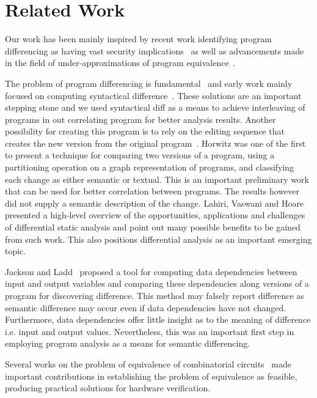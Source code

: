 \section{Related Work}

Our work has been mainly inspired by recent work identifying program differencing as having vast security implications~\cite{BrumleyPoosankamSongZheng08,SongSunZhang09} as well as advancements made in the field of under-approximations of program equivalence~\cite{GodlinStrichman09, KawaguchiLahiriRebelo10, DwyerElbaumPerson08, EnglerRamos11}.

The problem of program differencing is fundamental~\cite{Hoare69} and early work mainly focused on computing syntactical difference~\cite{HuntMcIlroy75}. These solutions are an important stepping stone and we used syntactical diff as a means to achieve interleaving of programs in out correlating program for better analysis results. Another possibility for creating this program is to rely on the editing sequence that creates the new version from the original program~\cite{Horwitz90}. Horwitz was one of the first to present a technique for comparing two versions of a program, using a partitioning operation on a graph representation of programs, and classifying each change as either semantic or textual. This is an important preliminary work that can be used for better correlation between programs. The results however did not supply a semantic description of the change. Lahiri, Vaswani and Hoare \cite{DiffAnalysis} presented a high-level overview of the opportunities, applications and challenges of differential static analysis and point out many possible benefits to be gained from such work. This also positions differential analysis as an important emerging topic.

Jackson and Ladd~\cite{JacksonLadd94} proposed a tool for computing data dependencies between input and output variables and comparing these dependencies along versions of a program for discovering difference. This method may falsely report difference as semantic difference may occur even if data dependencies have not changed. Furthermore, data dependencies offer little insight as to the meaning of difference i.e. input and output values. Nevertheless, this was an important first step in employing program analysis as a means for semantic differencing.

Several works on the problem of equivalence of combinatorial circuits~\cite{KuehlmannKrohm97,BraytonChatterjeeMishchenkoEen06, ClarkeKroening03} made important contributions in establishing the problem of equivalence as feasible, producing practical solutions for hardware verification.

